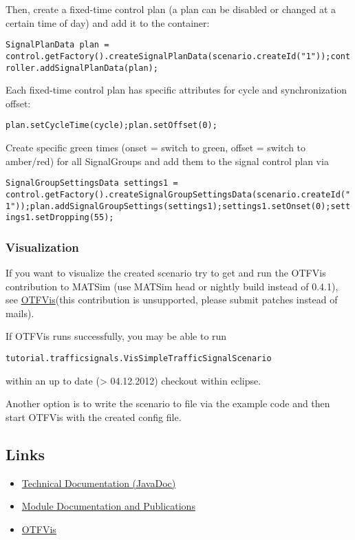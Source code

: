 Then, create a fixed-time control plan (a plan can be disabled or changed at a certain time of day) and add it to the container:


\texttt{\nolinebreak    SignalPlanData plan = control.getFactory().createSignalPlanData(scenario.createId("1"));\nolinebreak    controller.addSignalPlanData(plan);\nolinebreak  }

Each fixed-time control plan has specific attributes for cycle and synchronization offset:


\texttt{\nolinebreak    plan.setCycleTime(cycle);\nolinebreak   plan.setOffset(0);\nolinebreak }

Create specific green times (onset = switch to green, offset = switch to amber/red) for all SignalGroups and add them to the signal control plan via


\texttt{\nolinebreak    SignalGroupSettingsData settings1 = control.getFactory().createSignalGroupSettingsData(scenario.createId("1"));\nolinebreak   plan.addSignalGroupSettings(settings1);\nolinebreak   settings1.setOnset(0);\nolinebreak   settings1.setDropping(55);\nolinebreak }

\subsubsection{Visualization}

If you want to visualize the created scenario try to get and run the OTFVis contribution to MATSim (use MATSim head or nightly build instead of 0.4.1), see \href{http://matsim.org/docs/extensions/otfvis}{OTFVis}(this contribution is unsupported, please submit patches instead of mails).

If OTFVis runs successfully, you may be able to run


\texttt{\nolinebreak  tutorial.trafficsignals.VisSimpleTrafficSignalScenario }

within an up to date (> 04.12.2012) checkout within eclipse.

Another option is to write the scenario to file via the example code and then start OTFVis with the created config file.

\subsection{Links}
\begin{itemize}
	\item \href{http://ci.matsim.org:8080/job/MATSim_M2/javadoc/org/matsim/signalsystems/package-summary.html}{Technical Documentation (JavaDoc)}
	\item \href{http://matsim.org/node/384}{Module Documentation and Publications}
	\item \href{http://matsim.org/node/693}{OTFVis}
\end{itemize}

